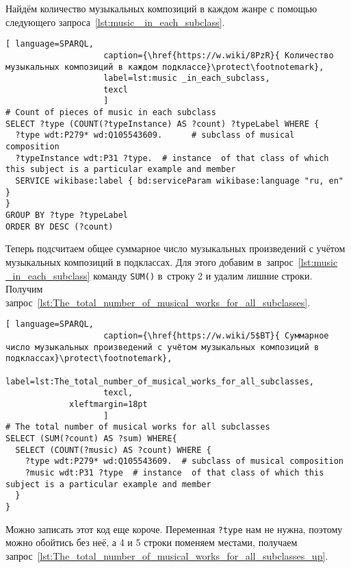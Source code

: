Найдём количество музыкальных композиций в каждом жанре с помощью следующего запроса~\ref{lst:music _in_each_subclass}.

\begin{lstlisting}[ language=SPARQL,
                    caption={\href{https://w.wiki/8PzR}{ Количество музыкальных композиций в каждом подклассе}\protect\footnotemark},
                    label=lst:music _in_each_subclass,
                    texcl
                    ]
# Count of pieces of music in each subclass
SELECT ?type (COUNT(?typeInstance) AS ?count) ?typeLabel WHERE {
  ?type wdt:P279* wd:Q105543609.      # subclass of musical composition
  ?typeInstance wdt:P31 ?type.  # instance  of that class of which this subject is a particular example and member
  SERVICE wikibase:label { bd:serviceParam wikibase:language "ru, en" }
}
GROUP BY ?type ?typeLabel
ORDER BY DESC (?count)
\end{lstlisting}%

\newpage
Теперь подсчитаем общее суммарное число музыкальных произведений с учётом музыкальных композиций в подклассах. Для этого добавим в~запрос~\ref{lst:music _in_each_subclass} команду \lstinline|SUM()| в~строку 2 и удалим лишние строки. Получим запрос~\ref{lst:The_total_number_of_musical_works_for_all_subclasses}.

\begin{lstlisting}[ language=SPARQL,
                    caption={\href{https://w.wiki/5$BT}{ Суммарное число музыкальных произведений с учётом музыкальных композиций в подклассах}\protect\footnotemark},
                    label=lst:The_total_number_of_musical_works_for_all_subclasses,
                    texcl,
	         xleftmargin=18pt
                    ]
# The total number of musical works for all subclasses 
SELECT (SUM(?count) AS ?sum) WHERE{
  SELECT (COUNT(?music) AS ?count) WHERE {
    ?type wdt:P279* wd:Q105543609.  # subclass of musical composition
    ?music wdt:P31 ?type  # instance  of that class of which this subject is a particular example and member
  }
}
\end{lstlisting}%

Можно записать этот код еще короче. Переменная \lstinline|?type| нам не нужна, поэтому можно обойтись без неё, а 4 и 5 строки поменяем местами, получаем запрос~\ref{lst:The_total_number_of_musical_works_for_all_subclasses_up}.

